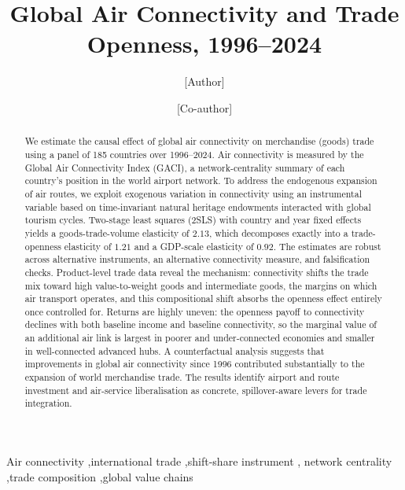 \makeatletter
\long{}
\makeatother
{}

\newcommand{\sym}[1]{\ensuremath{^{#1}}}



\begin{frontmatter}

\title{Global Air Connectivity and Trade Openness, 1996--2024}

\author[a]{[Author]}
\ead{[email]}
\author[a]{[Co-author]}
\address[a]{[Affiliation]}

\begin{abstract}
We estimate the causal effect of global air connectivity on merchandise (goods) trade using a panel of 185 countries over 1996--2024. Air connectivity is measured by the Global Air Connectivity Index (GACI), a
network-centrality summary of each country's position in the world airport network. To address the endogenous expansion of air routes, we exploit exogenous variation in connectivity using an instrumental variable based on time-invariant natural heritage endowments interacted with global tourism cycles. Two-stage least squares (2SLS) with country and year fixed effects yields a goods-trade-volume elasticity of $2.13$, which decomposes exactly into a trade-openness elasticity of $1.21$ and a GDP-scale elasticity of $0.92$. The estimates are robust across alternative instruments, an alternative connectivity measure, and falsification checks. Product-level trade data reveal the mechanism: connectivity shifts the trade mix toward high value-to-weight goods and intermediate goods, the margins on which air transport operates, and this compositional shift absorbs the openness effect entirely once controlled for. Returns are highly uneven: the openness payoff to connectivity declines with both baseline income and baseline connectivity, so the marginal value of an additional air link is largest in poorer and under-connected economies and smaller in well-connected advanced hubs. A counterfactual analysis suggests that improvements in global air connectivity since 1996 contributed substantially to the expansion of world merchandise trade. The results identify airport and route investment and air-service liberalisation as concrete, spillover-aware levers for trade integration.
\end{abstract}

\begin{keyword}
Air connectivity \sep international trade \sep shift-share instrument \sep
network centrality \sep trade composition \sep global value chains
\end{keyword}

\end{frontmatter}

